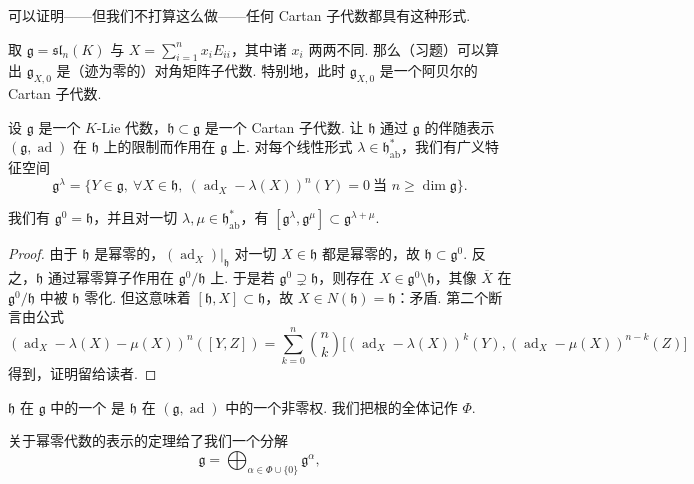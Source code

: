 \begin{remark*}
可以证明——但我们不打算这么做——任何 Cartan 子代数都具有这种形式.
\end{remark*}
\begin{example*}
取 $\mathfrak g=\mathfrak{sl}_{n}(K)$ 与 $X=\sum_{i=1}^{n}x_{i}E_{ii}$，其中诸 $x_{i}$ 两两不同. 那么（习题）可以算出 $\mathfrak g_{X,0}$ 是（迹为零的）对角矩阵子代数. 特别地，此时 $\mathfrak g_{X,0}$ 是一个阿贝尔的 Cartan 子代数.
\end{example*}
\begin{numpara}\label{np:lie-2-5-2}
设 $\mathfrak g$ 是一个 $K$-Lie 代数，$\mathfrak h\subset\mathfrak g$ 是一个 Cartan 子代数. 让 $\mathfrak h$ 通过 $\mathfrak g$ 的伴随表示 $(\mathfrak g,\operatorname{ad})$ 在 $\mathfrak h$ 上的限制而作用在 $\mathfrak g$ 上. 对每个线性形式 $\lambda\in\mathfrak h_{\mathrm{ab}}^{*}$，我们有广义特征空间
\[
\mathfrak g^{\lambda}=\bigl\{Y\in\mathfrak g,\ \forall X\in\mathfrak h,\ (\operatorname{ad}_{X}-\lambda(X))^{n}(Y)=0\ \text{当 }n\geqslant\dim\mathfrak g\bigr\}.
\]
\end{numpara}
\begin{lemma*}
我们有 $\mathfrak g^{0}=\mathfrak h$，并且对一切 $\lambda,\mu\in\mathfrak h_{\mathrm{ab}}^{*}$，有 $[\mathfrak g^{\lambda},\mathfrak g^{\mu}]\subset\mathfrak g^{\lambda+\mu}$.
\end{lemma*}
\begin{proof}
由于 $\mathfrak h$ 是幂零的，$(\operatorname{ad}_{X})|_{\mathfrak h}$ 对一切 $X\in\mathfrak h$ 都是幂零的，故 $\mathfrak h\subset\mathfrak g^{0}$. 反之，$\mathfrak h$ 通过幂零算子作用在 $\mathfrak g^{0}/\mathfrak h$ 上. 于是若 $\mathfrak g^{0}\supsetneq\mathfrak h$，则存在 $X\in\mathfrak g^{0}\setminus\mathfrak h$，其像 $\overline{X}$ 在 $\mathfrak g^{0}/\mathfrak h$ 中被 $\mathfrak h$ 零化. 但这意味着 $[\mathfrak h,X]\subset\mathfrak h$，故 $X\in N(\mathfrak h)=\mathfrak h$：矛盾.
第二个断言由公式
\[
(\operatorname{ad}_{X}-\lambda(X)-\mu(X))^{n}([Y,Z])=\sum_{k=0}^{n}\binom{n}{k}\bigl[(\operatorname{ad}_{X}-\lambda(X))^{k}(Y),(\operatorname{ad}_{X}-\mu(X))^{n-k}(Z)\bigr]
\]
得到，证明留给读者.
\end{proof}
\begin{definition*}
$\mathfrak h$ 在 $\mathfrak g$ 中的一个  是 $\mathfrak h$ 在 $(\mathfrak g,\operatorname{ad})$ 中的一个非零权. 我们把根的全体记作 $\Phi$.
\end{definition*}
关于幂零代数的表示的定理给了我们一个分解
\[
\mathfrak g=\bigoplus_{\alpha\in\Phi\cup\{0\}}\mathfrak g^{\alpha},
\]
